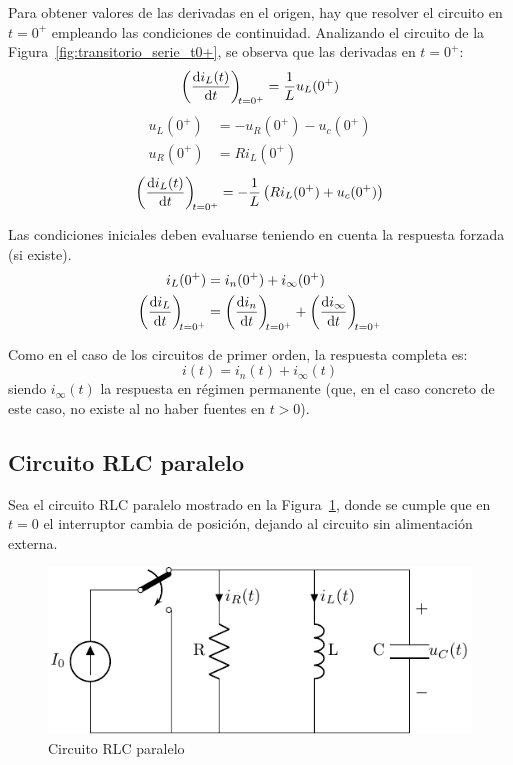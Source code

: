 Para obtener valores de las derivadas en el origen, hay que resolver
el circuito en \(t = 0^+\) empleando las condiciones de
continuidad. Analizando el circuito de la
Figura~\ref{fig:transitorio_serie_t0+}, se observa que las derivadas
en $t=0^+$:
\[
  \diff{i_L(t)}{t}[t = 0^+] = \frac{1}{L} u_L(0^+)
\]
\begin{align*}
  u_L(0^+) &= -u_R(0^+) - u_c(0^+)\\
  u_R(0^+) &= R i_L(0^+)
\end{align*}
\[ {\diff{i_L(t)}{t}[t = 0^+] = - \frac{1}{L}\left(R i_L(0^+) +
      u_c(0^+)\right)}
\]
\begin{remark}
  Las condiciones iniciales deben evaluarse teniendo en cuenta la
  respuesta forzada (si existe).
  \begin{align*}
    i_L(0^+) &= i_n(0^+) + i_{\infty}(0^+)\\
    \diff{i_L}{t}[t = 0^+] &= \diff{i_n}{t}[t = 0^+] + \diff{i_{\infty}}{t}[t = 0^+]  
  \end{align*}
\end{remark}
Como en el caso de los circuitos de primer orden, la respuesta
completa es:
\begin{equation*}
  i(t)=i_n(t)+i_\infty(t)
\end{equation*}
siendo $i_\infty(t)$ la respuesta en régimen permanente (que, en el
caso concreto de este caso, no existe al no haber fuentes en $t>0$).

\subsection{Circuito RLC paralelo}

Sea el circuito RLC paralelo mostrado en la
Figura~\ref{fig:transitorio_circuito_RLC_paralelo}, donde se cumple
que en $t = 0$ el interruptor cambia de posición, dejando al circuito
sin alimentación externa.
\begin{figure}[H]
  \centering
  \includegraphics{../figs/transitorio_circuitoRLC_paralelo.pdf}
  \caption{Circuito RLC paralelo}
  \label{fig:transitorio_circuito_RLC_paralelo}
\end{figure}

